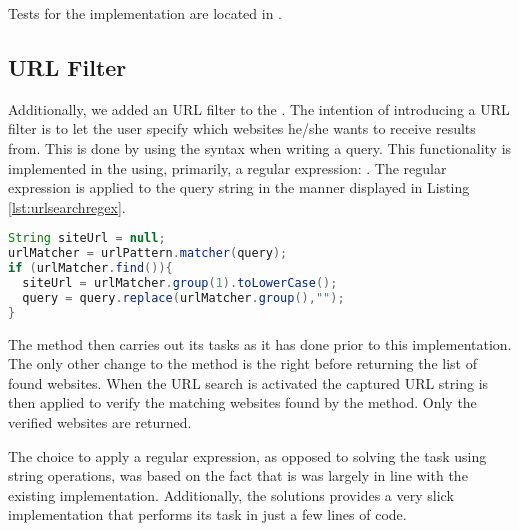 Tests for the implementation are located in .

\subsection{URL Filter}
Additionally, we added an URL filter to the . The intention of introducing a URL filter is to let the user specify which websites he/she wants to receive results from. This is done by using the syntax  when writing a query. This functionality is implemented in the  using, primarily, a regular expression: . The regular expression is applied to the query string in the manner displayed in Listing \ref{lst:urlsearchregex}. \\
\begin{lstlisting}[language=Java, caption=Applying the regular expression, label=lst:urlsearchregex]
String siteUrl = null;
urlMatcher = urlPattern.matcher(query);
if (urlMatcher.find()){
  siteUrl = urlMatcher.group(1).toLowerCase();
  query = query.replace(urlMatcher.group(),"");
}
\end{lstlisting}
The  method then carries out its tasks as it has done prior to this implementation. The only other change to the method is the  right before returning the list of found websites. When the URL search is activated the captured URL string is then applied to verify the matching websites found by the method. Only the verified websites are returned. 

The choice to apply a regular expression, as opposed to solving the task using string operations, was based on the fact that is was largely in line with the existing implementation. Additionally, the solutions provides a very slick implementation that performs its task in just a few lines of code.